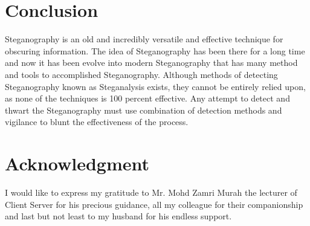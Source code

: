 \documentclass[conference, compsoc]{IEEEtran}
\begin{document}
\section{Conclusion}
Steganography is an old and incredibly versatile and effective technique for obscuring information. The idea of Steganography has been there for a long time and now it has been evolve into modern Steganography that has many method and tools to accomplished Steganography. Although methods of detecting Steganography known as Steganalysis exists, they cannot be entirely relied upon, as none of the techniques is 100 percent effective. Any attempt to detect and thwart the Steganography must use combination of detection methods and vigilance to blunt the effectiveness of the process.



\section*{Acknowledgment}
I would like to express my gratitude to Mr. Mohd Zamri Murah the lecturer of Client Server for his precious guidance, all my colleague for their companionship and last but not least to my husband for his endless support.






%
%
%





\end{document}
